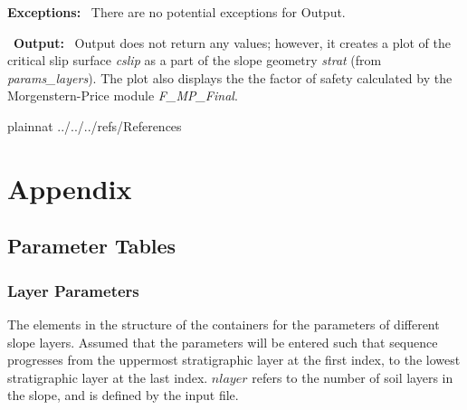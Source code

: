 \documentclass[12pt, titlepage]{article}
\begin{document}
\noindent \textbf{Exceptions:} ~\newline\noindent There are no
potential exceptions for Output.

~\newline\noindent \textbf{Output:} ~\newline\noindent Output does not
return any values; however, it creates a plot of the critical slip
surface \textit{cslip} as a part of the slope geometry \textit{strat}
(from \textit{params\_layers}). The plot also displays the
the factor of safety calculated by the Morgenstern-Price module 
\textit{F\_MP\_Final}.

\newpage

 {plainnat}
 {../../../refs/References}

\newpage

\section{Appendix}

\subsection{Parameter Tables} \label{sec:ParamTables}

\subsubsection{Layer Parameters} \label{Tbl:LayerParam}
\noindent
The elements in the structure of the containers for the parameters of
different slope layers. Assumed that the parameters will be entered
such that sequence progresses from the uppermost stratigraphic layer
at the first index, to the lowest stratigraphic layer at the last
index. $nlayer$ refers to the number of soil layers in the slope, and
is defined by the input file.
\end{document}
